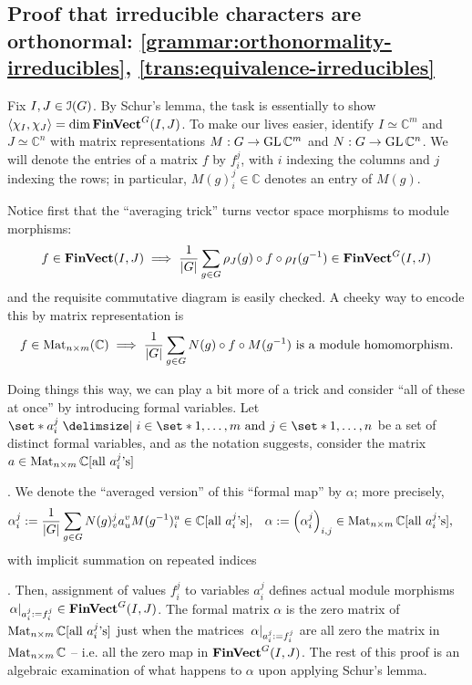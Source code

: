 \subsection{Proof that irreducible characters are orthonormal: \ref{grammar:orthonormality-irreducibles}, \ref{trans:equivalence-irreducibles}} %
\pan Fix $I, J \in \operatorname{\mathcal{I}}(G)$. By Schur's lemma, the task is essentially to show $\langle \chi_I, \chi_J \rangle = \dim \operatorname{\mathbf{FinVect}}^G (I, J)$. To make our lives easier, identify $I \simeq \mathbb{C}^m$ and $J \simeq \mathbb{C}^n$ with matrix representations $M : G \to \operatorname{GL} \mathbb{C}^m$ and $N : G \to \operatorname{GL} \mathbb{C}^n$. We will denote the entries of a matrix $f$ by $f^j_i$, with $i$ indexing the columns and $j$ indexing the rows; in particular, $M(g)^j_i \in \mathbb{C}$ denotes an entry of $M(g)$.
\par Notice first that the ``averaging trick'' turns vector space morphisms to module morphisms:
\begin{align*}
  f \in \operatorname{\mathbf{FinVect}}(I, J)
  \implies
  \frac{1}{\lvert G \rvert} \sum_{g \in G}
    \rho_J (g) \circ f \circ \rho_I (g^{-1})
  \in \operatorname{\mathbf{FinVect}}^G (I, J)
\end{align*}
and the requisite commutative diagram is easily checked. A cheeky way to encode this by matrix representation is
\begin{align*}
  f \in \operatorname{Mat}_{n \times m} (\mathbb{C})
  \implies
  \frac{1}{\lvert G \rvert} \sum_{g \in G}
    N (g) \circ f \circ M (g^{-1})
  \text{ is a module homomorphism}
  .
\end{align*}
\par Doing things this way, we can play a bit more of a trick and consider ``all of these at once'' by introducing formal variables. Let $
  \set*{
    a^j_i
  \given
    i \in \set*{1, \dots, m}
    \text{ and } j \in \set*{1, \dots, n}
  }
$ be a set of distinct formal variables, and as the notation suggests, consider the matrix $a \in \operatorname{Mat}_{n \times m} \mathbb{C}[\text{all } a^j_i \text{'s}]$ . We denote the ``averaged version'' of this ``formal map'' by $\alpha$; more precisely,
\begin{align*}
  \alpha^j_i
  &:= \frac{1}{\lvert G \rvert} \sum_{g \in G}
    N(g)^j_v a^v_u M(g^{-1})^u_i
  \in \mathbb{C}[\text{all } a^j_i \text{'s}]
  ,
  & \alpha
  &:= \left(
    \alpha^j_i
  \right)_{i, j}
  \in \operatorname{Mat}_{n \times m} \mathbb{C}[\text{all } a^j_i \text{'s}]
  ,
\end{align*}
with implicit summation on repeated indices . Then, assignment of values $f^j_i$ to variables $a^j_i$ defines actual module morphisms $
  \left. \alpha \right\rvert_{a^j_i := f^j_i}
  \in \operatorname{\mathbf{FinVect}}^G (I, J)
$. The formal matrix $\alpha$ is the zero matrix of $\operatorname{Mat}_{n \times m} \mathbb{C}[\text{all } a^j_i \text{'s}]$ just when the matrices $\left. \alpha \right\rvert_{a^j_i := f^j_i}$ are all zero the matrix in $\operatorname{Mat}_{n \times m} \mathbb{C}$ -- i.e. all the zero map in $\operatorname{\mathbf{FinVect}}^G (I, J)$. The rest of this proof is an algebraic examination of what happens to $\alpha$ upon applying Schur's lemma.

